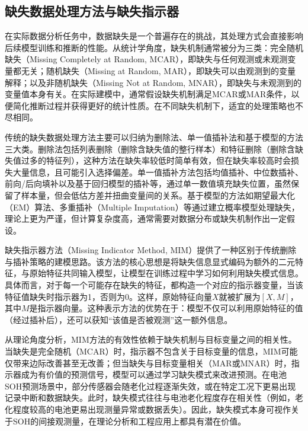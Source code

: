 \documentclass[10pt,a4paper]{ctexart}
\begin{document}
\subsection{缺失数据处理方法与缺失指示器}

在实际数据分析任务中，数据缺失是一个普遍存在的挑战，其处理方式会直接影响后续模型训练和推断的性能。从统计学角度，缺失机制通常被分为三类：完全随机缺失（Missing Completely at Random, MCAR），即缺失与任何观测或未观测变量都无关；随机缺失（Missing at Random, MAR），即缺失可以由观测到的变量解释；以及非随机缺失（Missing Not at Random, MNAR），即缺失与未观测到的变量值本身有关\cite{little2002statistical}。在实际建模中，通常假设缺失机制满足MCAR或MAR条件，以便简化推断过程并获得更好的统计性质\cite{little2002statistical}。在不同缺失机制下，适宜的处理策略也不尽相同。

传统的缺失数据处理方法主要可以归纳为删除法、单一值插补法和基于模型的方法三大类。删除法包括列表删除（删除含缺失值的整行样本）和特征删除（删除含缺失值过多的特征列），这种方法在缺失率较低时简单有效，但在缺失率较高时会损失大量信息，且可能引入选择偏差。单一值插补方法包括均值插补、中位数插补、前向/后向填补以及基于回归模型的插补等，通过单一数值填充缺失位置，虽然保留了样本量，但会低估方差并扭曲变量间的关系。基于模型的方法如期望最大化（EM）算法、多重插补（Multiple Imputation）等通过建立概率模型处理缺失，理论上更为严谨，但计算复杂度高，通常需要对数据分布或缺失机制作出一定假设。

缺失指示器方法（Missing Indicator Method, MIM）提供了一种区别于传统删除与插补策略的建模思路\cite{jones1996indicator,van2023missing}。该方法的核心思想是将缺失信息显式编码为额外的二元特征，与原始特征共同输入模型，让模型在训练过程中学习如何利用缺失模式信息\cite{ipsen2022deal}。具体而言，对于每一个可能存在缺失的特征，都构造一个对应的指示器变量，当该特征值缺失时指示器为1，否则为0。这样，原始特征向量$X$就被扩展为$[X, M]$，其中$M$是指示器向量。这种表示方法的优势在于：模型不仅可以利用原始特征的值（经过插补后），还可以获知“该值是否被观测”这一额外信息。

从理论角度分析，MIM方法的有效性依赖于缺失机制与目标变量之间的相关性。当缺失是完全随机（MCAR）时，指示器不包含关于目标变量的信息，MIM可能仅带来边际改善甚至无改善；但当缺失与目标变量相关（MAR或MNAR）时，指示器成为有价值的预测信号，模型可以通过学习缺失模式来改进预测。在电池SOH预测场景中，部分传感器会随老化过程逐渐失效，或在特定工况下更易出现记录中断和数据缺失。此时，缺失模式往往与电池老化程度存在相关性（例如，老化程度较高的电池更易出现测量异常或数据丢失）。因此，缺失模式本身可视作关于SOH的间接观测量，在理论分析和工程应用上都具有潜在价值。
\end{document}
